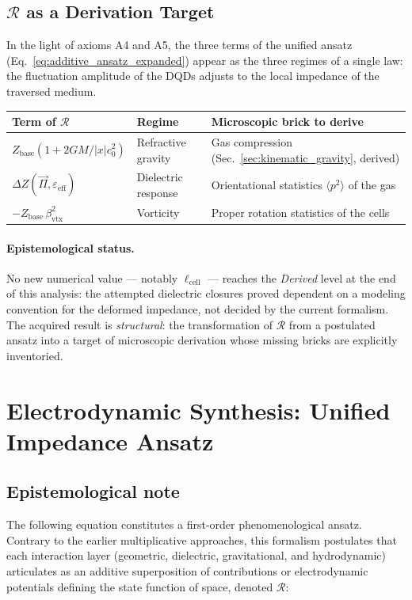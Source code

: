 \documentclass[11pt,a4paper]{article}
\theoremstyle{plain}
\theoremstyle{remark}
\begin{document}
\subsection{$\mathcal{R}$ as a Derivation Target}

In the light of axioms A4 and A5, the three terms of the unified ansatz (Eq.~\ref{eq:additive_ansatz_expanded}) appear as the three regimes of a single law: the fluctuation amplitude of the DQDs adjusts to the local impedance of the traversed medium.

\begin{center}
\begin{tabular}{lll}
\toprule
\textbf{Term of $\mathcal{R}$} & \textbf{Regime} & \textbf{Microscopic brick to derive} \\
\midrule
$Z_{\text{base}}(1+2GM/|x|c_0^2)$ & Refractive gravity & Gas compression (Sec.~\ref{sec:kinematic_gravity}, derived) \\
$\Delta Z(\vec{\Pi},\varepsilon_{\text{eff}})$ & Dielectric response & Orientational statistics $\langle p^2\rangle$ of the gas \\
$-Z_{\text{base}}\,\beta_{\text{vtx}}^2$ & Vorticity & Proper rotation statistics of the cells \\
\bottomrule
\end{tabular}
\end{center}

\paragraph{Epistemological status.} No new numerical value --- notably $\ell_{\text{cell}}$ --- reaches the \emph{Derived} level at the end of this analysis: the attempted dielectric closures proved dependent on a modeling convention for the deformed impedance, not decided by the current formalism. The acquired result is \emph{structural}: the transformation of $\mathcal{R}$ from a postulated ansatz into a target of microscopic derivation whose missing bricks are explicitly inventoried.

\section{Electrodynamic Synthesis: Unified Impedance Ansatz}
\label{sec:electrodynamic_synthesis}

\subsection*{Epistemological note}
The following equation constitutes a first-order phenomenological ansatz. Contrary to the earlier multiplicative approaches, this formalism postulates that each interaction layer (geometric, dielectric, gravitational, and hydrodynamic) articulates as an additive superposition of contributions or electrodynamic potentials defining the state function of space, denoted $\mathcal{R}$:
\end{document}
